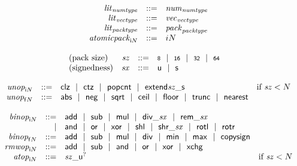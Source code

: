 $$
\begin{array}[t]{@{}lrrl@{}l@{}}
& {{\mathit{lit}}}_{{\mathit{numtype}}} & ::= & {{\mathit{num}}}_{{\mathit{numtype}}} \\
& {{\mathit{lit}}}_{{\mathit{vectype}}} & ::= & {{\mathit{vec}}}_{{\mathit{vectype}}} \\
& {{\mathit{lit}}}_{{\mathit{packtype}}} & ::= & {{\mathit{pack}}}_{{\mathit{packtype}}} \\
& {{\mathit{atomicpack}}}_{{\mathsf{i}}{N}} & ::= & {i}{N} \\
\end{array}
$$

\vspace{1ex}

$$
\begin{array}[t]{@{}lrrl@{}l@{}}
\mbox{(pack size)} & {\mathit{sz}} & ::= & \mathsf{{\scriptstyle 8}} ~~|~~ \mathsf{{\scriptstyle 16}} ~~|~~ \mathsf{{\scriptstyle 32}} ~~|~~ \mathsf{{\scriptstyle 64}} \\
\mbox{(signedness)} & {\mathit{sx}} & ::= & \mathsf{u} ~~|~~ \mathsf{s} \\
\end{array}
$$

$$
\begin{array}[t]{@{}lrrl@{}l@{}}
& {{\mathit{unop}}}_{{\mathsf{i}}{N}} & ::= & \mathsf{clz} ~~|~~ \mathsf{ctz} ~~|~~ \mathsf{popcnt} ~~|~~ {\mathsf{extend}}{{\mathit{sz}}}{\mathsf{\_}}{\mathsf{s}} & \quad \mbox{if}~ {\mathit{sz}} < N \\
& {{\mathit{unop}}}_{{\mathsf{f}}{N}} & ::= & \mathsf{abs} ~~|~~ \mathsf{neg} ~~|~~ \mathsf{sqrt} ~~|~~ \mathsf{ceil} ~~|~~ \mathsf{floor} ~~|~~ \mathsf{trunc} ~~|~~ \mathsf{nearest} \\
\end{array}
$$

$$
\begin{array}[t]{@{}lrrl@{}l@{}}
& {{\mathit{binop}}}_{{\mathsf{i}}{N}} & ::= & \mathsf{add} ~~|~~ \mathsf{sub} ~~|~~ \mathsf{mul} ~~|~~ {\mathsf{div}}{\mathsf{\_}}{{\mathit{sx}}} ~~|~~ {\mathsf{rem}}{\mathsf{\_}}{{\mathit{sx}}} \\
& & | & \mathsf{and} ~~|~~ \mathsf{or} ~~|~~ \mathsf{xor} ~~|~~ \mathsf{shl} ~~|~~ {\mathsf{shr}}{\mathsf{\_}}{{\mathit{sx}}} ~~|~~ \mathsf{rotl} ~~|~~ \mathsf{rotr} \\
& {{\mathit{binop}}}_{{\mathsf{f}}{N}} & ::= & \mathsf{add} ~~|~~ \mathsf{sub} ~~|~~ \mathsf{mul} ~~|~~ \mathsf{div} ~~|~~ \mathsf{min} ~~|~~ \mathsf{max} ~~|~~ \mathsf{copysign} \\
& {{\mathit{rmwop}}}_{{\mathsf{i}}{N}} & ::= & \mathsf{add} ~~|~~ \mathsf{sub} ~~|~~ \mathsf{and} ~~|~~ \mathsf{or} ~~|~~ \mathsf{xor} ~~|~~ \mathsf{xchg} \\
& {{\mathit{atop}}}_{{\mathsf{i}}{N}} & ::= & {{\mathit{sz}}}{\mathsf{\_}}{{\mathsf{u}^?}} & \quad \mbox{if}~ {\mathit{sz}} < N \\
\end{array}
$$

